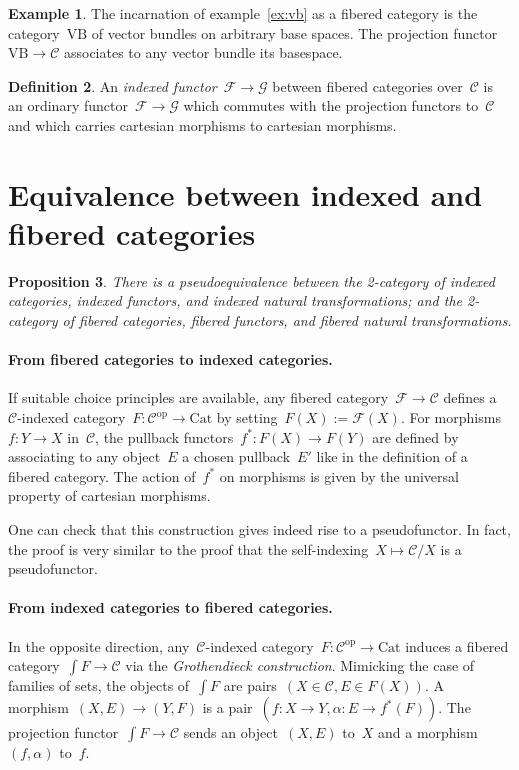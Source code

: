 \documentclass[a4paper,english,12pt]{scrartcl}
\theoremstyle{definition}
\newtheorem{defn}{Definition}[section]
\newtheorem{ex}[defn]{Example}
\theoremstyle{plain}
\newtheorem{prop}[defn]{Proposition}
\theoremstyle{remark}
\newcommand{\C}{\mathcal{C}}
\newcommand{\F}{\mathcal{F}}
\newcommand{\G}{\mathcal{G}}
\newcommand{\op}{\mathrm{op}}
\newcommand{\Cat}{\mathrm{Cat}}
\newcommand{\VB}{\mathrm{VB}}
\begin{document}
\begin{ex}The incarnation of example~\ref{ex:vb} as a fibered category is the
category~$\VB$ of vector bundles on arbitrary base spaces. The projection
functor~$\VB \to \C$ associates to any vector bundle its basespace.\end{ex}

\begin{defn}An \emph{indexed functor}~$\F \to \G$ between fibered categories
over~$\C$ is an ordinary functor~$\F \to \G$ which commutes with the projection
functors to~$\C$ and which carries cartesian morphisms to cartesian
morphisms.\end{defn}


\section{Equivalence between indexed and fibered categories}

\begin{prop}There is a pseudoequivalence between the 2-category of indexed
categories, indexed functors, and indexed natural transformations; and the
2-category of fibered categories, fibered functors, and fibered natural
transformations.\end{prop}

\paragraph{From fibered categories to indexed categories.}
If suitable choice principles are available, any fibered category~$\F \to \C$
defines a~$\C$-indexed category~$F : \C^\op \to \Cat$ by setting~$F(X) :=
\F(X)$. For morphisms~$f : Y \to X$ in~$\C$, the pullback functors~$f^* : F(X)
\to F(Y)$ are defined by associating to any object~$E$ a chosen pullback~$E'$
like in the definition of a fibered category. The action of~$f^*$ on morphisms
is given by the universal property of cartesian morphisms.

One can check that this construction gives indeed rise to a pseudofunctor. In
fact, the proof is very similar to the proof that the self-indexing~$X \mapsto
\C/X$ is a pseudofunctor.

\paragraph{From indexed categories to fibered categories.}
In the opposite direction, any~$\C$-indexed category~$F : \C^\op \to \Cat$
induces a fibered category~$\int F \to \C$ via the \emph{Grothendieck
construction}. Mimicking the case of families of sets, the objects of~$\int F$
are pairs~$(X \in \C, E \in F(X))$. A morphism~$(X,E) \to (Y,F)$ is a pair~$(f
: X \to Y, \alpha : E \to f^*(F))$. The projection functor~$\int F \to \C$
sends an object~$(X,E)$ to~$X$ and a morphism~$(f,\alpha)$ to~$f$.
\end{document}
